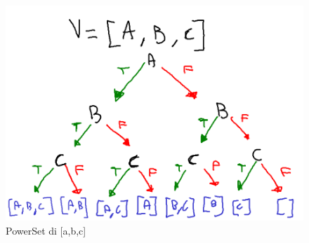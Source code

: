 \documentclass[a4paper]{article}
\begin{document}
\begin{figure}[!ht]
\centering
\includegraphics[scale = 0.5]{./img/A1_2.png}
\caption{PowerSet di [a,b,c]} \label{FIG:PowerSet}
\end{figure}
\end{document}

